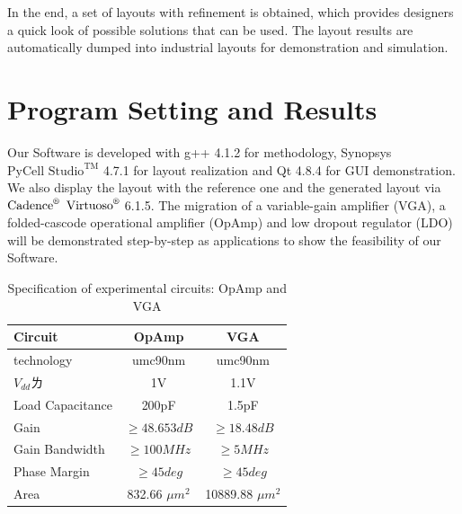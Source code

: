   In the end, a set of layouts with refinement is obtained, which provides designers a quick look of possible solutions that can be used. The layout results are automatically dumped into industrial layouts for demonstration and simulation. 


\section{Program Setting and Results}
  
  Our Software is developed with g++ 4.1.2 for methodology, Synopsys $\text{PyCell Studio}^{\text{TM} }$ 4.7.1 for layout realization and Qt 4.8.4 for GUI demonstration. We also display the layout with the reference one and the generated layout via $\text{Cadence}^{\text{\textregistered}}$ $\text{Virtuoso}^{\text{\textregistered}}$ 6.1.5. The migration of a variable-gain amplifier (VGA), a folded-cascode operational amplifier (OpAmp) and low dropout regulator (LDO) will be demonstrated step-by-step as applications to show the feasibility of our Software. 
  \begin{table}[ht]
      \begin{center}
      \scriptsize
      \caption{Specification of experimental circuits: OpAmp and VGA}\label{table:Spec}
      \begin{tabular}{|l|c|c|}
      \hline
        Circuit   & OpAmp & VGA \\ 
        \hline
        technology  & umc90nm & umc90nm     \\
        \hline
        $V_{dd}ㄌ$     & 1V    & 1.1V        \\
        \hline
        Load Capacitance  & 200pF & 1.5pF   \\
        \hline
        Gain    & $\geq 48.653dB$ & $\geq 18.48dB$      \\
        \hline
        Gain Bandwidth &  $\geq 100 MHz$ & $\geq 5MHz$      \\
        \hline
        Phase Margin  & $\geq 45deg$ & $\geq 45deg$     \\
        \hline
        Area    & 832.66 $\mu m^2$  & 10889.88 $\mu m^2$  \\
      \hline
      \end{tabular}
    \end{center}
  \end{table}

